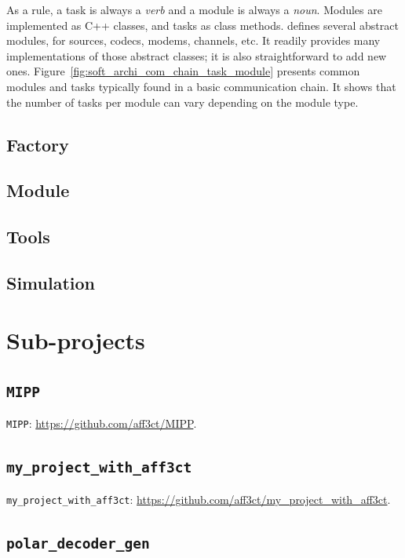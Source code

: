 As a rule, a task is always a \emph{verb} and a module is always a \emph{noun}.
Modules are implemented as C++ classes, and tasks as class methods. \AFFECT
defines several abstract modules, for sources, codecs, modems, channels, etc. It
readily provides many implementations of those abstract classes; it is also
straightforward to add new ones.
Figure~\ref{fig:soft_archi_com_chain_task_module} presents common modules and
tasks typically found in a basic communication chain. It shows that the number
of tasks per module can vary depending on the module type.

\subsection{Factory}

\subsection{Module}

\subsection{Tools}

\subsection{Simulation}

\section{Sub-projects}

\subsection{\texttt{MIPP}}

\texttt{MIPP}: \url{https://github.com/aff3ct/MIPP}.

\subsection{\texttt{my\_project\_with\_aff3ct}}

\texttt{my\_project\_with\_aff3ct}: \url{https://github.com/aff3ct/my_project_with_aff3ct}.

\subsection{\texttt{polar\_decoder\_gen}}

